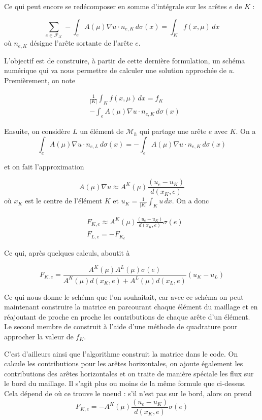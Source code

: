 \documentclass[12pt,a4paper,article]{memoir} %
\begin{document}
Ce qui peut encore se redécomposer en somme d'intégrale sur les arêtes $e$ de $K$ :

\[
    \sum_{e \in \mathcal{F_K}}-\int_{e}A(\mu)\nabla u \cdot n_{e,K} \, d\sigma(x)  = \int_{K}f(x,\mu) \, dx
\]
où $n_{e,K}$ désigne l'arête sortante de l'arête $e$.

L'objectif est de construire, à partir de cette dernière formulation, un schéma numérique qui va nous permettre de calculer 
une solution approchée de $u$. Premièrement, on note 

\begin{align*}
 &\frac{1}{|K|}\int_{K}f(x,\mu) \, dx = f_K \\
 &-\int_{e}A(\mu)\nabla u \cdot n_{e, K} \, d\sigma(x)
\end{align*}

Ensuite, on considère $L$ un élément de $\mathcal{M}_h$ qui partage une arête $e$ avec $K$. On a 
\[
    \int_{e}A(\mu)\nabla u \cdot n_{e,L} \, d\sigma(x) = -  \int_{e}A(\mu)\nabla u \cdot n_{e,K} \, d\sigma(x) 
\]

et on fait l'approximation 

\[
    A(\mu)\nabla u \approx A^{K}(\mu)\frac{(u_e - u_K)}{d(x_K, e)}
\]
où $x_K$ est le centre de l'élément $K$ et $u_K = \frac{1}{|K|}\int_{K}u \, dx$. On a donc

\begin{align*}
    &F_{K,e} \approx A^{K}(\mu)\frac{(u_e - u_K)}{d(x_K, e)} \sigma(e) \\
    &F_{L,e} = -F_{K_e} 
\end{align*}

Ce qui, après quelques calculs, aboutit à

\[
F_{K,e} = \frac{A^{K}(\mu)A^{L}(\mu)\sigma(e)}{A^{K}(\mu)d(x_K, e) + A^{L}(\mu)d(x_L, e)}(u_K - u_L)
\]
\vspace{0.3cm}

Ce qui nous donne le schéma que l'on souhaitait, car avec ce schéma on peut maintenant construire la matrice en parcourant chaque élément du maillage et
en réajoutant de proche en proche les contributions de chaque arête d'un élément. Le second membre de construit à l'aide d'une méthode de quadrature
pour approcher la valeur de $f_K$. 

\vspace{0.3cm}

C'est d'ailleurs ainsi que l'algorithme construit la matrice dans
 le code. On calcule les contributions pour les arêtes horizontales, 
on ajoute également les contributions des arêtes horizontales et on traite de manière spéciale les flux sur le bord du maillage. Il s'agit plus
ou moins de la même formule que ci-dessus. Cela dépend de où ce trouve le noeud : s'il n'est pas sur le bord, alors on prend
\[
    F_{K,e} = -A^{K}(\mu)\frac{(u_e - u_K)}{d(x_K, e)}\sigma(e)
\]
\end{document}
